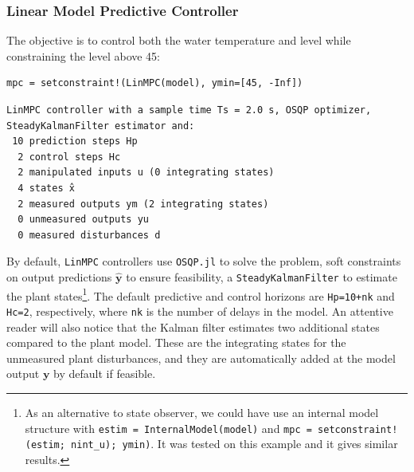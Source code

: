 \subsubsection{Linear Model Predictive Controller}

The objective is to control both the water temperature and level while constraining the level above 45:
\begin{verbatim}
mpc = setconstraint!(LinMPC(model), ymin=[45, -Inf])
\end{verbatim}
\spacerepl
\begin{verbatim}
LinMPC controller with a sample time Ts = 2.0 s, OSQP optimizer,
SteadyKalmanFilter estimator and:
 10 prediction steps Hp
  2 control steps Hc
  2 manipulated inputs u (0 integrating states)
  4 states x̂
  2 measured outputs ym (2 integrating states)
  0 unmeasured outputs yu
  0 measured disturbances d
\end{verbatim}
By default, \texttt{LinMPC} controllers use \texttt{OSQP.jl} \citep{osqp_jl} to solve the problem, soft constraints on output predictions $\mathbf{\hat y}$ to ensure feasibility, a \texttt{SteadyKalmanFilter} to estimate the plant states\footnote{As an alternative to state observer, we could have use an internal model structure with \texttt{estim = InternalModel(model)} and \texttt{mpc = setconstraint!(estim; nint\_u); ymin)}. It was tested on this example and it gives similar results.}. The default predictive and control horizons are \texttt{Hp=10+nk} and \texttt{Hc=2}, respectively, where \texttt{nk} is the number of delays in the model. An attentive reader will also notice that the Kalman filter estimates two additional states compared to the plant model. These are the integrating states for the unmeasured plant disturbances, and they are automatically added at the model output $\mathbf{y}$ by default if feasible.

